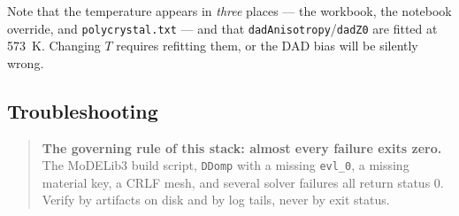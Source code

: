 \documentclass[11pt]{article}
\newcommand{\MoD}{\textsf{MoDELib3}}
\newcommand{\code}[1]{\texttt{\small #1}}
\newcommand{\file}[1]{\texttt{\footnotesize #1}}
\begin{document}
\noindent
Note that the temperature appears in \emph{three} places --- the workbook, the
notebook override, and \file{polycrystal.txt} --- and that
\code{dadAnisotropy}/\code{dadZ0} are fitted at 573~K. Changing $T$ requires
refitting them, or the DAD bias will be silently wrong.

\subsection{Troubleshooting}

\begin{quote}\small
\textbf{The governing rule of this stack: almost every failure exits zero.}
The \MoD{} build script, \code{DDomp} with a missing \file{evl\_0}, a missing
material key, a CRLF mesh, and several solver failures all return status 0.
Verify by artifacts on disk and by log tails, never by exit status.
\end{quote}
\end{document}
